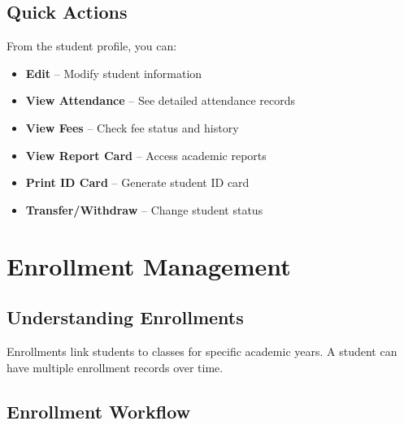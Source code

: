 \documentclass[12pt,a4paper]{report}
\begin{document}
\section{Quick Actions}

From the student profile, you can:

\begin{itemize}[leftmargin=*]
    \item \textbf{Edit} -- Modify student information
    \item \textbf{View Attendance} -- See detailed attendance records
    \item \textbf{View Fees} -- Check fee status and history
    \item \textbf{View Report Card} -- Access academic reports
    \item \textbf{Print ID Card} -- Generate student ID card
    \item \textbf{Transfer/Withdraw} -- Change student status
\end{itemize}

\chapter{Enrollment Management}

\section{Understanding Enrollments}

Enrollments link students to classes for specific academic years. A student can have multiple enrollment records over time.

\section{Enrollment Workflow}

\begin{center}
\end{center}
\end{document}
